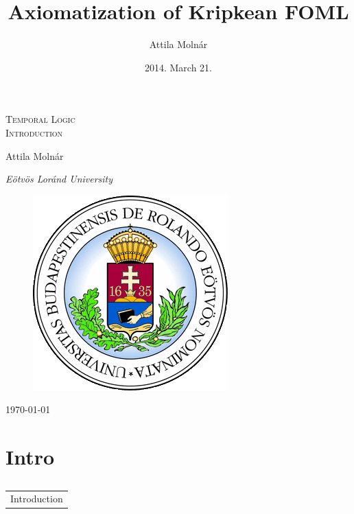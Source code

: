 \documentclass[xcolor=x11names]{beamer}
\author{Attila Moln\'ar}
\date{2014. March 21.}
\title{Axiomatization of Kripkean FOML}
\institute{ELTE}
\makeatletter
\let\beamer@writeslidentry@miniframeson=\beamer@writeslidentry
\def\beamer@writeslidentry@miniframesoff{%
  \expandafter\beamer@ifempty\expandafter{\beamer@framestartpage}{}%
  {%
    \clearpage\beamer@notesactions%
  }
}
\newcommand*{\miniframeson}{\let\beamer@writeslidentry=\beamer@writeslidentry@miniframeson}
\newcommand*{\miniframesoff}{\let\beamer@writeslidentry=\beamer@writeslidentry@miniframesoff}
\newcommand{\cimdia}[1] {\miniframesoff \begin{frame}\begin{center}\huge \begin{tabular}{c}#1\end{tabular}\end{center}\end{frame}\miniframeson}
\newcommand{\szakasz}[2][]{\section{#1}\subsection{}\cimdia{#2}}
\makeatother
\begin{document}
\footnotesize


\begin{frame}
\centering
\textsc{\Large Temporal Logic \\[1em] Introduction}

\bigskip

{ \small Attila Moln\'ar

    \textit{E\"otv\"os Lor\'and University}}

 \begin{figure}
\includegraphics[scale=.3]{elte_cimer.png}
 \end{figure}

	\today
\end{frame}

\szakasz[Intro]{Introduction}
\end{document}

